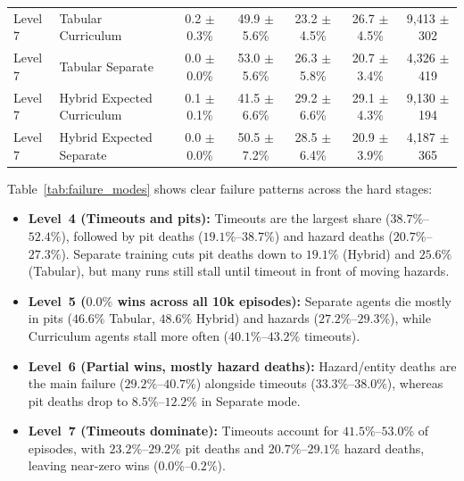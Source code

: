 \begin{table}[t]
{\begin{tabular}{llccccc}
\midrule
Level 7 & Tabular Curriculum & 0.2 $\pm$ 0.3\% & 49.9 $\pm$ 5.6\% & 23.2 $\pm$ 4.5\% & 26.7 $\pm$ 4.5\% & 9,413 $\pm$ 302 \\
Level 7 & Tabular Separate & 0.0 $\pm$ 0.0\% & 53.0 $\pm$ 5.6\% & 26.3 $\pm$ 5.8\% & 20.7 $\pm$ 3.4\% & 4,326 $\pm$ 419 \\
Level 7 & Hybrid Expected Curriculum & 0.1 $\pm$ 0.1\% & 41.5 $\pm$ 6.6\% & 29.2 $\pm$ 6.6\% & 29.1 $\pm$ 4.3\% & 9,130 $\pm$ 194 \\
Level 7 & Hybrid Expected Separate & 0.0 $\pm$ 0.0\% & 50.5 $\pm$ 7.2\% & 28.5 $\pm$ 6.4\% & 20.9 $\pm$ 3.9\% & 4,187 $\pm$ 365 \\
\bottomrule
\end{tabular}%
}
\end{table}

Table~\ref{tab:failure_modes} shows clear failure patterns across the hard stages:
\begin{itemize}
    \item \textbf{Level~4 (Timeouts and pits):} Timeouts are the largest share ($38.7\%$--$52.4\%$), followed by pit deaths ($19.1\%$--$38.7\%$) and hazard deaths ($20.7\%$--$27.3\%$). Separate training cuts pit deaths down to $19.1\%$ (Hybrid) and $25.6\%$ (Tabular), but many runs still stall until timeout in front of moving hazards.
    \item \textbf{Level~5 ($0.0\%$ wins across all 10k episodes):} Separate agents die mostly in pits ($46.6\%$ Tabular, $48.6\%$ Hybrid) and hazards ($27.2\%$--$29.3\%$), while Curriculum agents stall more often ($40.1\%$--$43.2\%$ timeouts).
    \item \textbf{Level~6 (Partial wins, mostly hazard deaths):} Hazard/entity deaths are the main failure ($29.2\%$--$40.7\%$) alongside timeouts ($33.3\%$--$38.0\%$), whereas pit deaths drop to $8.5\%$--$12.2\%$ in Separate mode.
    \item \textbf{Level~7 (Timeouts dominate):} Timeouts account for $41.5\%$--$53.0\%$ of episodes, with $23.2\%$--$29.2\%$ pit deaths and $20.7\%$--$29.1\%$ hazard deaths, leaving near-zero wins ($0.0\%$--$0.2\%$).
\end{itemize}

